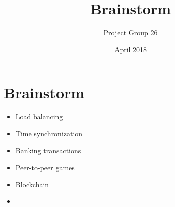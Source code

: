 \documentclass{article}
\title{Brainstorm}
\author{Project Group 26}
\date{April 2018}
\begin{document}
\maketitle

\section{Brainstorm}


\begin{itemize}
    \item Load balancing
    \item Time synchronization
    \item Banking transactions
    \item Peer-to-peer games
    \item Blockchain
    \item 
\end{itemize}
\end{document}
